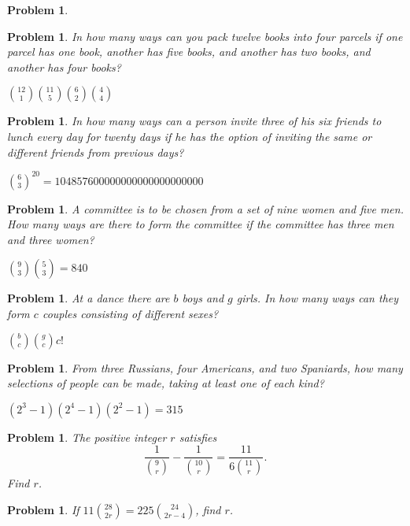 \documentclass[11pt, openany]{book}
\theoremstyle{change} \theoremheaderfont{\blue\sffamily\bfseries}
\newtheorem{pro}[thm]{Problem}
\theoremstyle{nonumberplain} \theoremheaderfont{\sffamily\bfseries}
\def\binom#1#2{{#1\choose#2}}
\newcommand{\í}{\'{\i}}
\begin{document}
\begin{multicols}{2}
\begin{pro}
\begin{answer}
\end{answer}
 \end{pro}
  \begin{pro} In how many ways can you pack twelve books into four parcels if
one parcel has one book, another has five books, and another has two
books, and another has four books?\begin{answer} $\binom{12}{1}
\binom{11}{5} \binom{6}{2} \binom{4}{4}  $
\end{answer}
  \end{pro}
    \begin{pro} In how many ways can a person invite three of his six friends to
lunch every day for twenty days if he has the option of inviting the
same or different friends from previous days?\begin{answer}
$\binom{6}{3}^{20} = 104857600000000000000000000$
\end{answer}
  \end{pro}
     \begin{pro} A committee is to be chosen from a set of nine women and five
men. How many ways are there to form the committee if the committee
has three men and three women?\begin{answer} $\binom{9}{3}
\binom{5}{3} = 840$
\end{answer}
    \end{pro}
          \begin{pro}
At a dance there are $b$ boys and $g$ girls. In how many ways can
they form $c$ couples consisting of different sexes?
\begin{answer}$\binom{b}{c}\binom{g}{c}c!$
\end{answer}
   \end{pro}         \begin{pro} From three Russians, four Americans, and two Spaniards, how many
selections of people can be made, taking at least one of each kind?
\begin{answer} $(2^3 - 1)(2^4 - 1)(2^2-1) = 315$
\end{answer}
   \end{pro}
        \begin{pro}

The positive integer $r$ satisfies
$$\dfrac{1}{\binom{9}{r}} - \dfrac{1}{\binom{10}{r}} =
\dfrac{11}{6\binom{11}{r}}.
$$Find $r$.

  \end{pro}
           \begin{pro}
If $11\binom{28}{2r} = 225\binom{24}{2r - 4}$, find $r$.


\end{pro}
\end{multicols}
\end{document}
